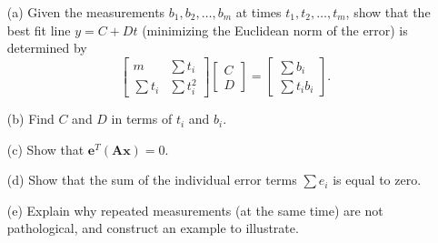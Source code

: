 \documentclass{article}
\newcommand{\mA}{\mathbf{A}}
\newcommand{\vx}{\mathbf{x}}
\newcommand{\ve}{\mathbf{e}}
\begin{document}
\begin{itemize}
    \item[(a)] Given the measurements $b_1, b_2, \dots, b_m$ at times $t_1, t_2, \dots, t_m$, show that the best fit line $y = C + Dt$ (minimizing the Euclidean norm of the error) is determined by
    \[
    \begin{bmatrix}
    m & \sum t_i \\
    \sum t_i & \sum t_i^2
    \end{bmatrix}
    \begin{bmatrix}
    C \\
    D
    \end{bmatrix}
    =
    \begin{bmatrix}
    \sum b_i \\
    \sum t_i b_i
    \end{bmatrix}.
    \]
    \item[(b)] Find $C$ and $D$ in terms of $t_i$ and $b_i$.
    \item[(c)] Show that $\ve^T(\mA\vx) = 0$.
    \item[(d)] Show that the sum of the individual error terms $\sum e_i$ is equal to zero.
    \item[(e)] Explain why repeated measurements (at the same time) are not pathological, and construct an example to illustrate.
\end{itemize}
\end{document}

